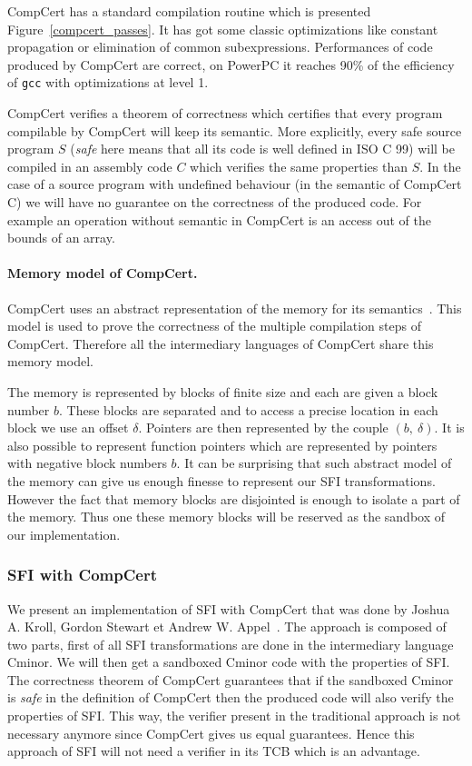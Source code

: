 \documentclass[11pt]{sdm}
\begin{document}
CompCert has a standard compilation routine which is presented Figure~\ref{compcert_passes}. It has got some classic optimizations like constant propagation or elimination of common subexpressions. Performances of code produced by CompCert are correct, on PowerPC it reaches 90\% of the efficiency of \texttt{gcc} with optimizations at level 1.

CompCert verifies a theorem of correctness which certifies that every program compilable by CompCert will keep its semantic. More explicitly, every safe source program $S$ (\textit{safe} here means that all its code is well defined in ISO C 99) will be compiled in an assembly code $C$ which verifies the same properties than $S$.
In the case of a source program with undefined behaviour (in the semantic of CompCert C) we will have no guarantee on the correctness of the produced code.
For example an operation without semantic in CompCert is an access out of the bounds of an array.

\paragraph{Memory model of CompCert.}
\label{par:Memory model of CompCert}
CompCert uses an abstract representation of the memory for its semantics~\cite{compCert_memory_model}. This model is used to prove the correctness of the multiple compilation steps of CompCert. Therefore all the intermediary languages of CompCert share this memory model.

The memory is represented by blocks of finite size and each are given a block number $b$. These blocks are separated and to access a precise location in each block we use an offset $\delta$. Pointers are then represented by the couple $(b,~\delta)$. It is also possible to represent function pointers which are represented by pointers with negative block numbers $b$. It can be surprising that such abstract model of the memory can give us enough finesse to represent our SFI transformations. However the fact that memory blocks are disjointed is enough to isolate a part of the memory. Thus one these memory blocks will be reserved as the sandbox of our implementation.

\subsubsection{SFI with CompCert}
\label{ssub:SFI with CompCert}

We present an implementation of SFI with CompCert that was done by Joshua A. Kroll, Gordon Stewart et Andrew W. Appel~\cite{Kroll:2014:PSF:2708449.2708686}. The approach is composed of two parts, first of all SFI transformations are done in the intermediary language Cminor. We will then get a sandboxed Cminor code with the properties of SFI. The correctness theorem of CompCert guarantees that if the sandboxed Cminor is \textit{safe} in the definition of CompCert then the produced code will also verify the properties of SFI.
This way, the verifier present in the traditional approach is not necessary anymore since CompCert gives us equal guarantees. Hence this approach of SFI will not need a verifier in its TCB which is an advantage.
\end{document}
